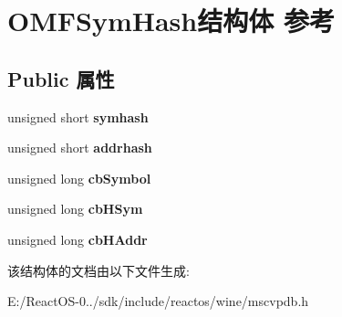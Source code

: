 \hypertarget{struct_o_m_f_sym_hash}{}\section{O\+M\+F\+Sym\+Hash结构体 参考}
\label{struct_o_m_f_sym_hash}
\subsection*{Public 属性}
\begin{DoxyCompactItemize}
\item 
\mbox{\label{struct_o_m_f_sym_hash_a65994c2907242d1221325ea3d26851c4}} 
unsigned short {\bfseries symhash}
\item 
\mbox{\label{struct_o_m_f_sym_hash_a110d875bdb2c38c40a27d11c054f34a4}} 
unsigned short {\bfseries addrhash}
\item 
\mbox{\label{struct_o_m_f_sym_hash_a7d2cb6e5cde1c33dce785aa2104d6edc}} 
unsigned long {\bfseries cb\+Symbol}
\item 
\mbox{\label{struct_o_m_f_sym_hash_afbc04428185046659f90e92e52f71baf}} 
unsigned long {\bfseries cb\+H\+Sym}
\item 
\mbox{\label{struct_o_m_f_sym_hash_a2a65982ef7e7e3c3fbe4197267b20ed1}} 
unsigned long {\bfseries cb\+H\+Addr}
\end{DoxyCompactItemize}


该结构体的文档由以下文件生成\+:\begin{DoxyCompactItemize}
\item 
E\+:/\+React\+O\+S-\/0../sdk/include/reactos/wine/mscvpdb.\+h\end{DoxyCompactItemize}
